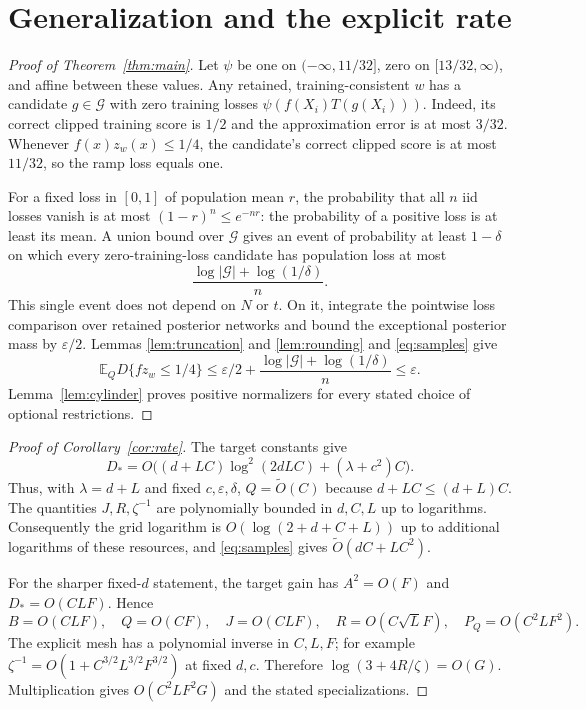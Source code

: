 \documentclass[11pt]{article}
\newcommand{\E}{\mathbb E}
\begin{document}
\section{Generalization and the explicit rate}

\begin{proof}[Proof of Theorem~\ref{thm:main}]
Let $\psi$ be one on $(-\infty,11/32]$, zero on
$[13/32,\infty)$, and affine between these values. Any retained,
training-consistent $w$ has a candidate $g\in\mathcal G$ with zero
training losses $\psi(f(X_i)T(g(X_i)))$. Indeed, its correct clipped
training score is $1/2$ and the approximation error is at most $3/32$.
Whenever $f(x)z_w(x)\le1/4$, the candidate's correct clipped score is at
most $11/32$, so the ramp loss equals one.

For a fixed loss in $[0,1]$ of population mean $r$, the probability that
all $n$ iid losses vanish is at most $(1-r)^n\le e^{-nr}$: the probability
of a positive loss is at least its mean. A union bound over
$\mathcal G$ gives an event of probability at least $1-\delta$ on which
every zero-training-loss candidate has population loss at most
\[
 \frac{\log|\mathcal G|+\log(1/\delta)}n.
\]
This single event does not depend on $N$ or $t$. On it, integrate the
pointwise loss comparison over retained posterior networks and bound the
exceptional posterior mass by $\varepsilon/2$. Lemmas
\ref{lem:truncation} and \ref{lem:rounding} and \eqref{eq:samples} give
\[
 \E_Q D\{fz_w\le1/4\}\le\varepsilon/2+
 \frac{\log|\mathcal G|+\log(1/\delta)}n\le\varepsilon.
\]
Lemma~\ref{lem:cylinder} proves positive normalizers for every stated
choice of optional restrictions.
\end{proof}

\begin{proof}[Proof of Corollary~\ref{cor:rate}]
The target constants give
\[
 D_*=O\bigl((d+LC)\log^2(2dLC)+(\lambda+c^2)C\bigr).
\]
Thus, with $\lambda=d+L$ and fixed $c,\varepsilon,\delta$,
$Q=\widetilde O(C)$ because $d+LC\le(d+L)C$.
The quantities $J,R,\zeta^{-1}$ are polynomially bounded in $d,C,L$
up to logarithms. Consequently the grid logarithm is
$O(\log(2+d+C+L))$ up to additional logarithms of these resources, and
\eqref{eq:samples} gives $\widetilde O(dC+LC^2)$.

For the sharper fixed-$d$ statement, the target gain has $A^2=O(F)$ and
$D_*=O(CLF)$. Hence
\[
 B=O(CLF),\quad Q=O(CF),\quad J=O(CLF),\quad
 R=O(C\sqrt L F),\quad P_Q=O(C^2LF^2).
\]
The explicit mesh has a polynomial inverse in $C,L,F$; for example
$\zeta^{-1}=O(1+C^{3/2}L^{3/2}F^{3/2})$ at fixed $d,c$.
Therefore $\log(3+4R/\zeta)=O(G)$. Multiplication gives
$O(C^2LF^2G)$ and the stated specializations.
\end{proof}
\end{document}
